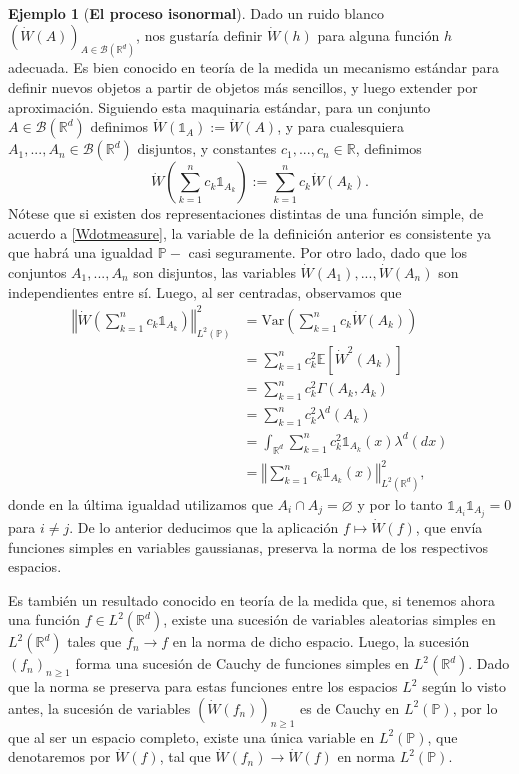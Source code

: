 \documentclass[letterpaper,twoside,12pt]{book}
\newcommand{\R}{\mathbb{R}}
\newcommand{\B}{\mathcal{B}}
\newcommand{\E}{\mathbb{E}}
\renewcommand{\P}{\mathbb{P}}
\newcommand{\W}{\dot{W}}
\newcommand{\1}{\mathds{1}}
\renewcommand{\to}{\rightarrow}
\newcommand{\norm}[1]{\left\Vert #1 \right\Vert}
\theoremstyle{definition}
\theoremstyle{definition}
\theoremstyle{remark}
\theoremstyle{definition}
\theoremstyle{definition}
\theoremstyle{definition}
\theoremstyle{definition}
\newtheorem{ejem}{Ejemplo}
\theoremstyle{definition}
\begin{document}
\begin{ejem}[\textbf{El proceso isonormal}]\label{ruidoprocesoiso}
Dado un ruido blanco $\left(\W(A)\right)_{A\in \B(\R^d)}$, nos gustaría definir $\W(h)$ para alguna función $h$ adecuada. Es bien conocido en teoría de la medida un mecanismo estándar para definir nuevos objetos a partir de objetos más sencillos, y luego extender por aproximación. Siguiendo esta maquinaria estándar, para un conjunto $A\in \B(\R^d)$ definimos $\W(\1_A):=\W(A)$, y para cualesquiera $A_1,...,A_n\in \B(\R^{d})$ disjuntos, y constantes $c_1,...,c_n\in \R$, definimos
\[
\W \left(\sum_{k=1}^{n}c_k\1_{A_k}\right):=\sum_{k=1}^{n}c_k\W(A_k).    
\]
Nótese que si existen dos representaciones distintas de una función simple, de acuerdo a \eqref{Wdotmeasure}, la variable de la definición anterior es consistente ya que habrá una igualdad $\P-$ casi seguramente. Por otro lado, dado que los conjuntos $A_1,...,A_n$ son disjuntos, las variables $\W(A_1),...,\W(A_n)$ son independientes entre sí. Luego, al ser centradas, observamos que
\begin{align*}
    \norm{\W \left(\sum_{k=1}^{n}c_k\1_{A_k}\right)}_{L^{2}(\P)}^2&=\text{Var}\left(\sum_{k=1}^{n}c_k\W(A_k)\right)\\
    &=\sum_{k=1}^{n}c_k^2 \E\left[\W^2(A_k)\right]\\
    &=\sum_{k=1}^{n}c_k^2 \Gamma(A_k,A_k)\\
    &=\sum_{k=1}^{n}c_k^2\lambda^{d}(A_k)\\
    &=\int_{\R^d}\sum_{k=1}^{n}c_k^2\1_{A_k}(x)\lambda^d(dx)\\
    &=\norm{\sum_{k=1}^{n}c_k\1_{A_k}(x)}^2_{L^{2}(\R^{d})},
\end{align*}
donde en la última igualdad utilizamos que $A_i\cap A_j=\varnothing$ y por lo tanto $\1_{A_i}\1_{A_j}=0$ para $i\neq j$. De lo anterior deducimos que la aplicación $f\longmapsto \W(f)$, que envía funciones simples en variables gaussianas, preserva la norma de los respectivos espacios.

Es también un resultado conocido en teoría de la medida que, si tenemos ahora una función $f\in L^{2}(\R^{d})$, existe una sucesión de variables aleatorias simples en $L^{2}(\R^d)$ tales que $f_n\to f$ en la norma de dicho espacio. Luego, la sucesión $(f_n)_{n\ge 1}$ forma una sucesión de Cauchy de funciones simples en $L^2(\R^{d})$. Dado que la norma se preserva para estas funciones entre los espacios $L^2$ según lo visto antes, la sucesión de variables $(\W(f_n))_{n\ge 1}$ es de Cauchy en $L^{2}(\P)$, por lo que al ser un espacio completo, existe una única variable en $L^{2}(\P)$, que denotaremos por $\W(f)$, tal que $\W(f_n)\longrightarrow \W(f)$ en norma $L^{2}(\P)$.


\end{ejem}
\end{document}
